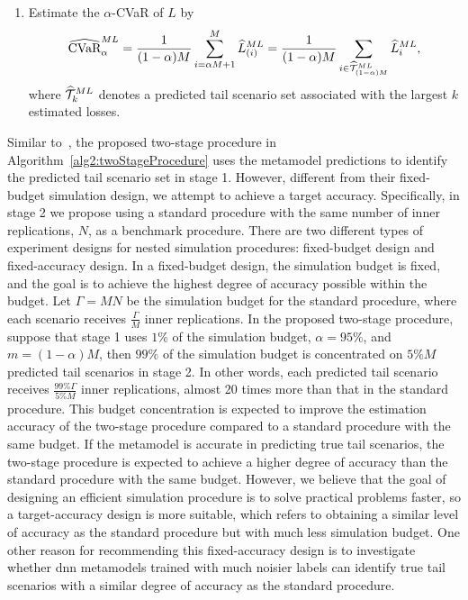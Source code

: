 \begin{algorithm}
\begin{algorithmic}[1]
\begin{enumerate} [label=\alph*., itemsep=0pt, parsep=0pt, topsep=0pt]
        \item Estimate the $\alpha$-CVaR of $L$ by 
        $$\widehat{\mbox{CVaR}}^{ML}_\alpha = \frac{1}{(1-\alpha)M} \sum_{i=\alpha M + 1}^{M}\widehat{L}_{(i)}^{ML} = \frac{1}{(1-\alpha)M} \sum_{i \in \widehat{\mathcal{T}}_{(1-\alpha)M}^{ML}}\widehat{L}_{i}^{ML},$$ 
        where $\widehat{\mathcal{T}}_{k}^{ML}$ denotes a predicted tail scenario set associated with the largest $k$ estimated losses.
    \end{enumerate}
\end{algorithmic}
\end{algorithm}

Similar to~\cite{dang2020efficient}, the proposed two-stage procedure in Algorithm~\ref{alg2:twoStageProcedure} uses the metamodel predictions to identify the predicted tail scenario set in stage 1.
However, different from their fixed-budget simulation design, we attempt to achieve a target accuracy.
Specifically, in stage 2 we propose using a standard procedure with the same number of inner replications, $N$, as a benchmark procedure.
There are two different types of experiment designs for nested simulation procedures: fixed-budget design and fixed-accuracy design.
In a fixed-budget design, the simulation budget is fixed, and the goal is to achieve the highest degree of accuracy possible within the budget.
Let $\Gamma = MN$ be the simulation budget for the standard procedure, where each scenario receives $\frac{\Gamma}{M}$ inner replications.
In the proposed two-stage procedure, suppose that stage 1 uses $1\%$ of the simulation budget, $\alpha = 95\%$, and $m=(1-\alpha)M$, then $99\%$ of the simulation budget is concentrated on $5\% M$ predicted tail scenarios in stage 2.
In other words, each predicted tail scenario receives $\frac{99\% \Gamma}{5\% M}$ inner replications, almost 20 times more than that in the standard procedure.
This budget concentration is expected to improve the estimation accuracy of the two-stage procedure compared to a standard procedure with the same budget. 
If the metamodel is accurate in predicting true tail scenarios, the two-stage procedure is expected to achieve a higher degree of accuracy than the standard procedure with the same budget.
However, we believe that the goal of designing an efficient simulation procedure is to solve practical problems faster, so a target-accuracy design is more suitable, which refers to obtaining a similar level of accuracy as the standard procedure but with much less simulation budget.
One other reason for recommending this fixed-accuracy design is to investigate whether \gls{dnn} metamodels trained with much noisier labels can identify true tail scenarios with a similar degree of accuracy as the standard procedure.
